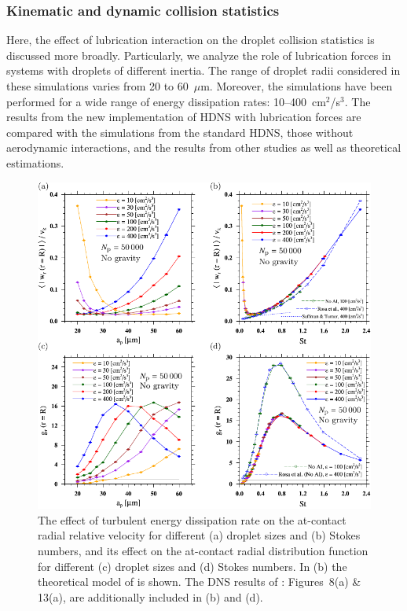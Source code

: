 \documentclass[../thesis.tex]{subfiles}
\begin{document}
\subsubsection{Kinematic and dynamic collision statistics}
Here, the effect of lubrication interaction on the droplet collision statistics is discussed more broadly. Particularly, we analyze the role of lubrication forces in systems with droplets of different inertia. The range of droplet radii considered in these simulations varies from 20 to 60~$\mu$m. Moreover, the simulations have been performed for a wide range of energy dissipation rates: 10--400~cm$^2$/s$^3$. The results from the new implementation of HDNS with lubrication forces are compared with the simulations from the standard HDNS, those without aerodynamic interactions, and the results from other studies as well as theoretical estimations.

\begin{figure}%
\center
\includegraphics[width=\textwidth]{../figs/JFM/fig10.pdf}
\caption{The effect of turbulent energy dissipation rate on the at-contact radial relative velocity for different (a) droplet sizes and (b) Stokes numbers, and its effect on the at-contact radial distribution function for different (c) droplet sizes and (d) Stokes numbers. In (b) the theoretical model of \cite{ST56} is shown. The DNS results of \cite{RPAGW13}: Figures~8(a) \& 13(a), are additionally included in (b) and (d).}
\label{Fig10}
\end{figure}%
\end{document}
